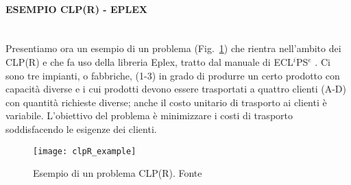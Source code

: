 \documentclass[12pt,a4paper,openright,twoside]{report}
\newcommand{\myparagraph}[1]{\paragraph{#1}\mbox{}\\}
\begin{document}
\myparagraph{ESEMPIO CLP(R) - EPLEX}

Presentiamo ora un esempio di un problema (Fig.~\ref{clpR_example}) che rientra nell'ambito dei CLP(R) e che fa uso della libreria Eplex, tratto dal manuale di ECL$^i$PS$^e$ \cite{eclipseTut}. Ci sono tre impianti, o fabbriche, (1-3) in grado di produrre un certo prodotto con capacità diverse e i cui prodotti devono essere trasportati a quattro clienti (A-D) con quantità richieste diverse; anche il costo unitario di trasporto ai clienti è variabile. L'obiettivo del problema è minimizzare i costi di trasporto soddisfacendo le esigenze dei clienti. 

\begin{figure}[h]
	\centering
	\texttt{[image: clpR\_example]}
	\caption{Esempio di un problema CLP(R). Fonte \cite{eclipseTut}}
	\label{clpR_example}
\end{figure}
\end{document}
